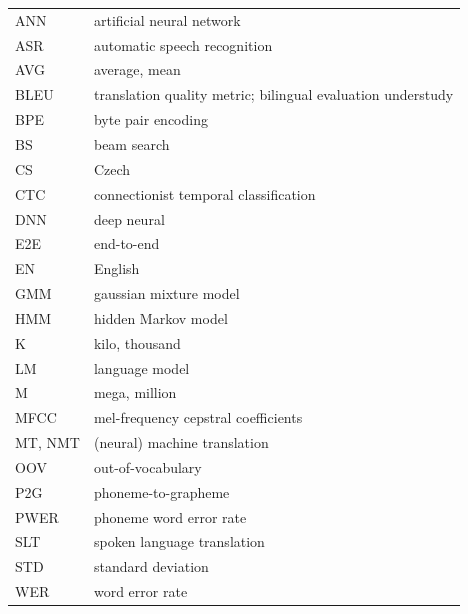 \documentclass[12pt,a4paper]{report}
\begin{document}
    \begin{tabular}{ll}
    	ANN & artificial neural network \\
        ASR & automatic speech recognition \\
        AVG & average, mean\\
        BLEU & translation quality metric; bilingual evaluation understudy\\
        BPE & byte pair encoding\\
        BS & beam search\\
        CS & Czech \\
        CTC & connectionist temporal classification\\
        DNN & deep neural \\
        E2E & end-to-end \\
        EN & English\\
        GMM & gaussian mixture model \\
        HMM & hidden Markov model \\
        K & kilo, thousand \\
        LM & language model\\
        M & mega, million \\
        MFCC & mel-frequency cepstral coefficients\\
        MT, NMT & (neural) machine translation\\
        OOV & out-of-vocabulary \\
        P2G & phoneme-to-grapheme \\
        PWER & phoneme word error rate\\
        SLT & spoken language translation\\
        STD & standard deviation \\
        WER & word error rate \\
        
    \end{tabular}

\appendix
\end{document}
